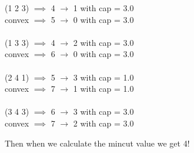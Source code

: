 \documentclass[12pt]{article}
\begin{document}
\begin{center}
(1 2 3) $\implies$ 4 $\rightarrow$ 1 with cap = 3.0 \\
convex $\implies$ 5 $\rightarrow$ 0 with cap = 3.0  \\ ~ \\
(1 3 3) $\implies$ 4 $\rightarrow$ 2 with cap = 3.0 \\
convex $\implies$ 6 $\rightarrow$ 0 with cap = 3.0  \\ ~ \\
(2 4 1) $\implies$ 5 $\rightarrow$ 3 with cap = 1.0 \\
convex $\implies$ 7 $\rightarrow$ 1 with cap = 1.0  \\ ~ \\
(3 4 3) $\implies$ 6 $\rightarrow$ 3 with cap = 3.0 \\
convex $\implies$ 7 $\rightarrow$ 2 with cap = 3.0
\end{center}

Then when we calculate the mincut value we get 4!

\newpage
\end{document}
